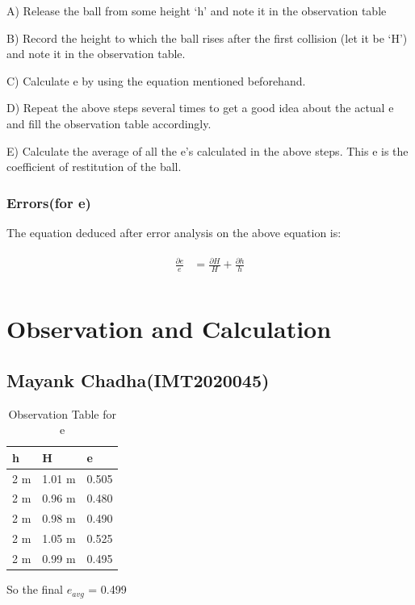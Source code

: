 \documentclass[11pt]{scrartcl} %
\begin{document}
A) Release the ball from some height ‘h’ and note it in the observation table \par

B) Record the height to which the ball rises after the first collision (let it be ‘H’) and note it in the observation table. \par

C) Calculate e by using the equation mentioned beforehand. \par

D) Repeat the above steps several times to get a good idea about the actual e and fill the observation table accordingly. \par

E) Calculate the average of all the e’s calculated in the above steps. This e is the coefficient of restitution of the ball. \par

\subsubsection{Errors(for e)}
The equation deduced after error analysis on the above equation is:\par

\begin{align} 
	\begin{split}
		\frac{\partial{e}}{e} &= \frac{\partial{H}}{H} + \frac{\partial{h}}{h}\\
	\end{split}					
\end{align}


\newpage
\section{Observation and Calculation}
\subsection{Mayank Chadha(IMT2020045)}

\begin{table}[h] %
	\centering %
	\begin{tabular}{l l l}
		\toprule
		\textbf{h} & \textbf{H} & \textbf{e} \\
		\midrule
		2 m & 1.01 m & 0.505\\
        2 m & 0.96 m  & 0.480\\
        2 m & 0.98 m  & 0.490\\
        2 m & 1.05 m & 0.525 \\
        2 m & 0.99 m & 0.495 \\
		\bottomrule
	\end{tabular}
	\caption{Observation Table for e}
\end{table}
So the final $e_{avg}$ = 0.499
\end{document}
